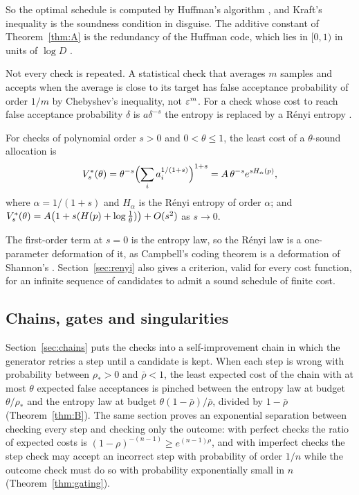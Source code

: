 So the optimal schedule is computed by Huffman's algorithm \cite{Huf52}, and Kraft's inequality \cite{Kra49,McM56} is the soundness condition in disguise. The additive constant of Theorem~\ref{thm:A} is the redundancy of the Huffman code, which lies in $[0,1)$ in units of $\log D$ \cite{CT06,Gal78}.

Not every check is repeated. A statistical check that averages $m$ samples and accepts when the average is close to its target has false acceptance probability of order $1/m$ by Chebyshev's inequality, not $\varepsilon^{m}$. For a check whose cost to reach false acceptance probability $\delta$ is $a\delta^{-s}$ the entropy is replaced by a R\'enyi entropy \cite{Ren61}.

\begin{mainthm}\label{thm:D}
For checks of polynomial order $s>0$ and $0<\theta\le1$, the least cost of a $\theta$-sound allocation is
\begin{equation}\label{eq:renyilaw}
V^{*}_{s}(\theta)=\theta^{-s}\Bigl(\sum_{i}a_{i}^{1/(1+s)}\Bigr)^{1+s}=A\,\theta^{-s}e^{sH_{\alpha}(p)},
\end{equation}
where $\alpha=1/(1+s)$ and $H_{\alpha}$ is the R\'enyi entropy of order $\alpha$; and $V^{*}_{s}(\theta)=A\bigl(1+s(H(p)+\log\frac1\theta)\bigr)+O(s^{2})$ as $s\to0$.
\end{mainthm}

The first-order term at $s=0$ is the entropy law, so the R\'enyi law is a one-parameter deformation of it, as Campbell's coding theorem is a deformation of Shannon's \cite{Cam65}. Section~\ref{sec:renyi} also gives a criterion, valid for every cost function, for an infinite sequence of candidates to admit a sound schedule of finite cost.

\subsection{Chains, gates and singularities}

Section~\ref{sec:chains} puts the checks into a self-improvement chain in which the generator retries a step until a candidate is kept. When each step is wrong with probability between $\rho_{\ast}>0$ and $\bar\rho<1$, the least expected cost of the chain with at most $\theta$ expected false acceptances is pinched between the entropy law at budget $\theta/\rho_{\ast}$ and the entropy law at budget $\theta(1-\bar\rho)/\bar\rho$, divided by $1-\bar\rho$ (Theorem~\ref{thm:B}). The same section proves an exponential separation between checking every step and checking only the outcome: with perfect checks the ratio of expected costs is $(1-\rho)^{-(n-1)}\ge e^{(n-1)\rho}$, and with imperfect checks the step check may accept an incorrect step with probability of order $1/n$ while the outcome check must do so with probability exponentially small in $n$ (Theorem~\ref{thm:gating}).

